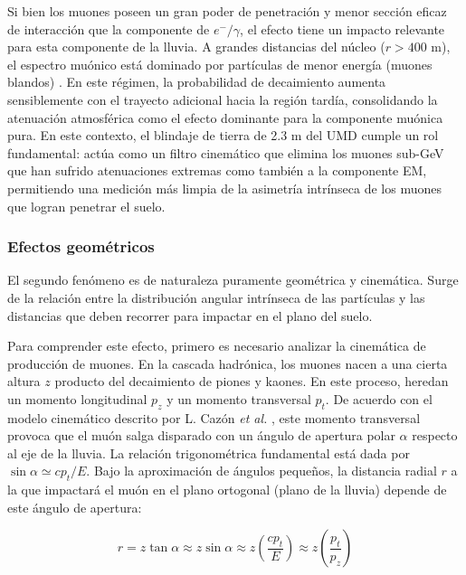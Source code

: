 Si bien los muones poseen un gran poder de penetración y menor sección eficaz de interacción que la componente de $e^{-}/\gamma$, el efecto tiene un impacto relevante para esta componente de la lluvia. A grandes distancias del núcleo ($r > 400 \text{ m}$), el espectro muónico está dominado por partículas de menor energía (muones blandos) \cite{Cazon2012}. En este régimen, la probabilidad de decaimiento aumenta sensiblemente con el trayecto adicional hacia la región tardía, consolidando la atenuación atmosférica como el efecto dominante para la componente muónica pura. En este contexto, el blindaje de tierra de 2.3 m del UMD cumple un rol fundamental: actúa como un filtro cinemático que elimina los muones sub-GeV que han sufrido atenuaciones extremas como también a la componente EM, permitiendo una medición más limpia de la asimetría intrínseca de los muones que logran penetrar el suelo.

\subsubsection{Efectos geométricos}
\label{subsubsec:divergencia}

El segundo fenómeno es de naturaleza puramente geométrica y cinemática. Surge de la relación entre la distribución angular intrínseca de las partículas y las distancias que deben recorrer para impactar en el plano del suelo.

Para comprender este efecto, primero es necesario analizar la cinemática de producción de muones. En la cascada hadrónica, los muones nacen a una cierta altura $z$ producto del decaimiento de piones y kaones. En este proceso, heredan un momento longitudinal $p_z$ y un momento transversal $p_t$. De acuerdo con el modelo cinemático descrito por L. Cazón \textit{et al.} \cite{Cazon2012}, este momento transversal provoca que el muón salga disparado con un ángulo de apertura polar $\alpha$ respecto al eje de la lluvia. La relación trigonométrica fundamental está dada por $\sin \alpha \simeq c p_t / E$. Bajo la aproximación de ángulos pequeños, la distancia radial $r$ a la que impactará el muón en el plano ortogonal (plano de la lluvia) depende de este ángulo de apertura:

\begin{equation}
	r = z \tan \alpha \approx z \sin \alpha \approx z \left( \frac{c p_t}{E} \right) \approx z \left( \frac{p_t}{p_z} \right)
\end{equation}

